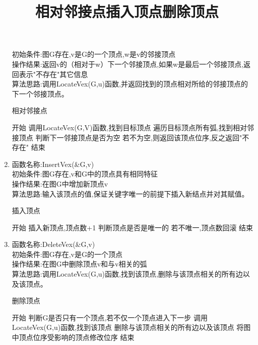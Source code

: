 \documentclass[supercite]{HustGraduPaper}
\theoremstyle{definition}
\begin{document}
\begin{enumerate}
	      初始条件:图G存在,v是G的一个顶点,w是v的邻接顶点\\
	      操作结果:返回v的（相对于w）下一个邻接顶点,如果w是最后一个邻接顶点,返回表示"不存在"其它信息\\
	      算法思路:调用LocateVex(G,u)函数,并返回找到的顶点相对所给的邻接顶点的下一个邻接顶点。
	      \begin{algorithm}[htb]
		      \title{相对邻接点}
		      \caption{相对邻接点}
		      \begin{algorithmic}[1]
			      \State 开始
			      \State 调用LocateVex(G,V)函数,找到目标顶点
			      \State 遍历目标顶点所有弧,找到相对邻接顶点
			      \State 判断下一邻接顶点是否为空
			      \State 若不为空,则返回该顶点位序,反之返回"不存在"
			      \State 结束
		      \end{algorithmic}\label{G6}
	      \end{algorithm}
	\item 函数名称:InsertVex(\&G,v)\\
	      初始条件:图G存在,v和G中的顶点具有相同特征\\
	      操作结果:在图G中增加新顶点v\\
	      算法思路:输入该顶点的值,保证关键字唯一的前提下插入新结点并对其赋值。
	      \begin{algorithm}[htb]
		      \title{插入顶点}
		      \caption{插入顶点}
		      \begin{algorithmic}[1]
			      \State 开始
			      \State 插入新顶点,顶点数+1
			      \State 判断顶点是否是唯一的
			      \State 若不唯一,顶点数回滚
			      \State 结束
		      \end{algorithmic}\label{G7}
	      \end{algorithm}
	      \newpage
	\item 函数名称:DeleteVex(\&G,v)\\
	      初始条件:图G存在,v是G的一个顶点\\
	      操作结果:在图G中删除顶点v和与v相关的弧\\
	      算法思路:调用LocateVex(G,u)函数,找到该顶点,删除与该顶点相关的所有边以及该顶点。
	      \begin{algorithm}[htb]
		      \title{删除顶点}
		      \caption{删除顶点}
		      \begin{algorithmic}[1]
			      \State 开始
			      \State 判断G是否只有一个顶点,若不仅一个顶点进入下一步
			      \State 调用LocateVex(G,u)函数,找到该顶点
			      \State 删除与该顶点相关的所有边以及该顶点
			      \State 将图中顶点位序受影响的顶点修改位序
			      \State 结束
		      \end{algorithmic}\label{G8}

\end{algorithm}
\end{enumerate}
\end{document}

